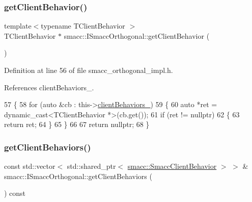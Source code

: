 \subsubsection{\texorpdfstring{get\+Client\+Behavior()}{getClientBehavior()}}
{\footnotesize\ttfamily template$<$typename T\+Client\+Behavior $>$ \\
T\+Client\+Behavior $\ast$ smacc\+::\+I\+Smacc\+Orthogonal\+::get\+Client\+Behavior (\begin{DoxyParamCaption}{ }\end{DoxyParamCaption})}



Definition at line 56 of file smacc\+\_\+orthogonal\+\_\+impl.\+h.



References client\+Behaviors\+\_\+.


\begin{DoxyCode}
57 \{
58     \textcolor{keywordflow}{for} (\textcolor{keyword}{auto} &cb : this->\hyperlink{classsmacc_1_1ISmaccOrthogonal_ad9e6c0f9055e51a61c9728ac7117dae2}{clientBehaviors\_})
59     \{
60         \textcolor{keyword}{auto} *ret = \textcolor{keyword}{dynamic\_cast<}TClientBehavior *\textcolor{keyword}{>}(cb.get());
61         \textcolor{keywordflow}{if} (ret != \textcolor{keyword}{nullptr})
62         \{
63             \textcolor{keywordflow}{return} ret;
64         \}
65     \}
66 
67     \textcolor{keywordflow}{return} \textcolor{keyword}{nullptr};
68 \}
\end{DoxyCode}
\mbox{\label{classsmacc_1_1ISmaccOrthogonal_a361c73750f24bcc4f1fa1db275bf957d}} 
\subsubsection{\texorpdfstring{get\+Client\+Behaviors()}{getClientBehaviors()}}
{\footnotesize\ttfamily const std\+::vector$<$ std\+::shared\+\_\+ptr$<$ \hyperlink{classsmacc_1_1SmaccClientBehavior}{smacc\+::\+Smacc\+Client\+Behavior} $>$ $>$ \& smacc\+::\+I\+Smacc\+Orthogonal\+::get\+Client\+Behaviors (\begin{DoxyParamCaption}{ }\end{DoxyParamCaption}) const\hspace{0.3cm}{\ttfamily [inline]}}



